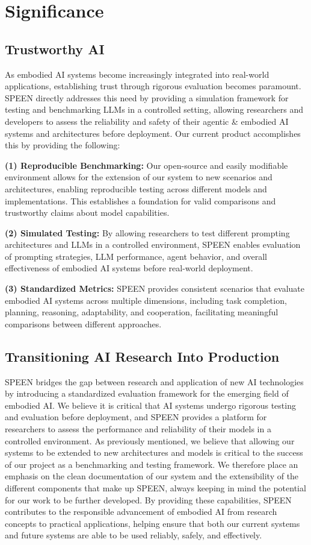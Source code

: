 \documentclass{article}
\begin{document}
\section{Significance}
\subsection{Trustworthy AI}
As embodied AI systems become increasingly integrated into real-world applications, establishing trust through rigorous evaluation becomes paramount.
SPEEN directly addresses this need by providing a simulation framework for testing and benchmarking LLMs in a controlled setting, allowing researchers and developers to assess the reliability and safety of their agentic \& embodied AI systems and architectures before deployment.
Our current product accomplishes this by providing the following: 

\textbf{(1) Reproducible Benchmarking:} Our open-source and easily modifiable environment allows for the extension of our system to new scenarios and architectures, enabling reproducible testing across different models and implementations.
This establishes a foundation for valid comparisons and trustworthy claims about model capabilities.

\textbf{(2) Simulated Testing:} By allowing researchers to test different prompting architectures and LLMs in a controlled environment, SPEEN enables evaluation of prompting strategies, LLM performance, agent behavior, and overall effectiveness of embodied AI systems before real-world deployment.

\textbf{(3) Standardized Metrics:} SPEEN provides consistent scenarios that evaluate embodied AI systems across multiple dimensions, including task completion, planning, reasoning, adaptability, and cooperation, facilitating meaningful comparisons between different approaches.

\subsection{Transitioning AI Research Into Production}
SPEEN bridges the gap between research and application of new AI technologies by introducing a standardized evaluation framework for the emerging field of embodied AI.
We believe it is critical that AI systems undergo rigorous testing and evaluation before deployment, and SPEEN provides a platform for researchers to assess the performance and reliability of their models in a controlled environment.
As previously mentioned, we believe that allowing our systems to be extended to new architectures and models is critical to the success of our project as a benchmarking and testing framework.
We therefore place an emphasis on the clean documentation of our system and the extensibility of the different components that make up SPEEN, always keeping in mind the potential for our work to be further developed.
By providing these capabilities, SPEEN contributes to the responsible advancement of embodied AI from research concepts to practical applications, helping ensure that both our current systems and future systems are able to be used reliably, safely, and effectively.
\end{document}

